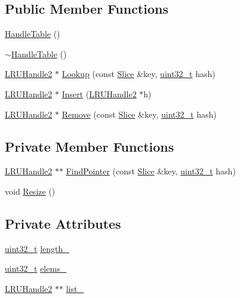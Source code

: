 \subsection*{Public Member Functions}
\begin{DoxyCompactItemize}
\item 
\hyperlink{classleveldb_1_1_handle_table_a2003f2733f107eaeccd9f5e76d3d2149}{Handle\+Table} ()
\item 
\hyperlink{classleveldb_1_1_handle_table_a8b125e3032f2498e8327cd1e0cf4b37d}{$\sim$\+Handle\+Table} ()
\item 
\hyperlink{structleveldb_1_1_l_r_u_handle2}{L\+R\+U\+Handle2} $\ast$ \hyperlink{classleveldb_1_1_handle_table_a2d45b0a36b3704a858db35f0dc10e570}{Lookup} (const \hyperlink{classleveldb_1_1_slice}{Slice} \&key, \hyperlink{stdint_8h_a435d1572bf3f880d55459d9805097f62}{uint32\+\_\+t} hash)
\item 
\hyperlink{structleveldb_1_1_l_r_u_handle2}{L\+R\+U\+Handle2} $\ast$ \hyperlink{classleveldb_1_1_handle_table_acd6e1eab094ad71076f1934c134772f5}{Insert} (\hyperlink{structleveldb_1_1_l_r_u_handle2}{L\+R\+U\+Handle2} $\ast$h)
\item 
\hyperlink{structleveldb_1_1_l_r_u_handle2}{L\+R\+U\+Handle2} $\ast$ \hyperlink{classleveldb_1_1_handle_table_abcb78349c142e3928ecfccac52d91b3c}{Remove} (const \hyperlink{classleveldb_1_1_slice}{Slice} \&key, \hyperlink{stdint_8h_a435d1572bf3f880d55459d9805097f62}{uint32\+\_\+t} hash)
\end{DoxyCompactItemize}
\subsection*{Private Member Functions}
\begin{DoxyCompactItemize}
\item 
\hyperlink{structleveldb_1_1_l_r_u_handle2}{L\+R\+U\+Handle2} $\ast$$\ast$ \hyperlink{classleveldb_1_1_handle_table_aaeb2ac2b37fadd75cc5db3064a26b831}{Find\+Pointer} (const \hyperlink{classleveldb_1_1_slice}{Slice} \&key, \hyperlink{stdint_8h_a435d1572bf3f880d55459d9805097f62}{uint32\+\_\+t} hash)
\item 
void \hyperlink{classleveldb_1_1_handle_table_a29f6371e07dfd825d23f04480fe1dede}{Resize} ()
\end{DoxyCompactItemize}
\subsection*{Private Attributes}
\begin{DoxyCompactItemize}
\item 
\hyperlink{stdint_8h_a435d1572bf3f880d55459d9805097f62}{uint32\+\_\+t} \hyperlink{classleveldb_1_1_handle_table_a8254dd30725b29b90577621864755128}{length\+\_\+}
\item 
\hyperlink{stdint_8h_a435d1572bf3f880d55459d9805097f62}{uint32\+\_\+t} \hyperlink{classleveldb_1_1_handle_table_a0cfd52cf822da2362069b34be8dda5db}{elems\+\_\+}
\item 
\hyperlink{structleveldb_1_1_l_r_u_handle2}{L\+R\+U\+Handle2} $\ast$$\ast$ \hyperlink{classleveldb_1_1_handle_table_aba06182026ed4b5420c076c488e56fac}{list\+\_\+}
\end{DoxyCompactItemize}


